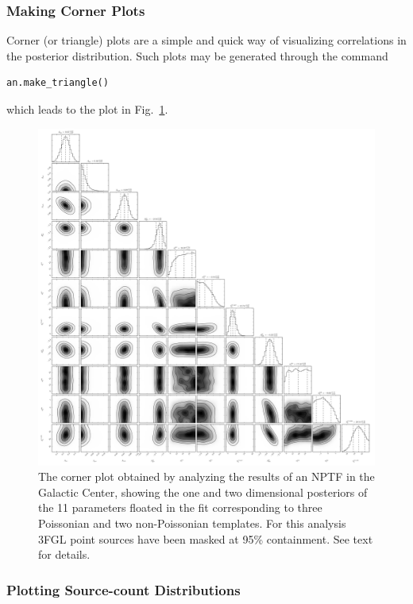 \subsubsection{Making Corner Plots}

Corner (or triangle) plots are a simple and quick way of visualizing correlations in the posterior distribution.  Such plots may be generated through the command
\begin{lstlisting}
an.make_triangle()
\end{lstlisting}
which leads to the plot in Fig.~\ref{fig:gc_triangle}.

\begin{figure}[htb]
\leavevmode
\begin{center}
\includegraphics[width=.98\textwidth]{ch-nptfit/gce_triangle.pdf}
\end{center}
\vspace{-.50cm}
\caption{The corner plot obtained by analyzing the results of an NPTF in the Galactic Center, showing the one and two dimensional posteriors of the 11 parameters floated in the fit corresponding to three Poissonian and two non-Poissonian templates. For this analysis 3FGL point sources have been masked at 95\% containment. See text for details.}
\label{fig:gc_triangle}
\end{figure}

\subsubsection{Plotting Source-count Distributions}

